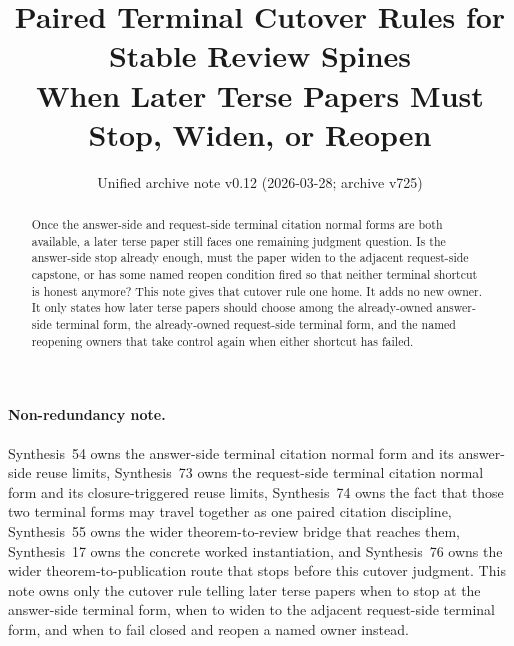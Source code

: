 \documentclass[11pt]{article}
\title{Paired Terminal Cutover Rules for Stable Review Spines\\
\large When Later Terse Papers Must Stop, Widen, or Reopen}
\author{}
\date{Unified archive note v0.12 (2026-03-28; archive v725)}
\begin{document}
\maketitle

\begin{abstract}
Once the answer-side and request-side terminal citation normal forms are both available, a later terse paper still faces one remaining judgment question.
Is the answer-side stop already enough, must the paper widen to the adjacent request-side capstone, or has some named reopen condition fired so that neither terminal shortcut is honest anymore?
This note gives that cutover rule one home.
It adds no new owner.
It only states how later terse papers should choose among the already-owned answer-side terminal form, the already-owned request-side terminal form, and the named reopening owners that take control again when either shortcut has failed.
\end{abstract}

\paragraph{Non-redundancy note.}
Synthesis~54 owns the answer-side terminal citation normal form and its answer-side reuse limits, Synthesis~73 owns the request-side terminal citation normal form and its closure-triggered reuse limits, Synthesis~74 owns the fact that those two terminal forms may travel together as one paired citation discipline, Synthesis~55 owns the wider theorem-to-review bridge that reaches them, Synthesis~17 owns the concrete worked instantiation, and Synthesis~76 owns the wider theorem-to-publication route that stops before this cutover judgment.\cite{series:challengeanswerreviewmenus,series:publicrequestresponsepacketrefreshresponsepacketclosureverdicts,series:pairedterminalcitationdiscipline,series:seriesspines,series:workedexample,series:theoremtopublicationspine}
This note owns only the cutover rule telling later terse papers when to stop at the answer-side terminal form, when to widen to the adjacent request-side terminal form, and when to fail closed and reopen a named owner instead.
\end{document}
